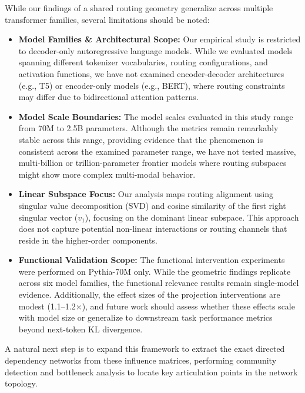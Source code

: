 \documentclass[11pt,a4paper]{article}
\theoremstyle{definition}
\theoremstyle{plain}
\begin{document}
While our findings of a shared routing geometry generalize across multiple transformer families, several limitations should be noted:
\begin{itemize}[leftmargin=*]
    \item \textbf{Model Families \& Architectural Scope:} Our empirical study is restricted to decoder-only autoregressive language models. While we evaluated models spanning different tokenizer vocabularies, routing configurations, and activation functions, we have not examined encoder-decoder architectures (e.g., T5) or encoder-only models (e.g., BERT), where routing constraints may differ due to bidirectional attention patterns.
    \item \textbf{Model Scale Boundaries:} The model scales evaluated in this study range from 70M to 2.5B parameters. Although the metrics remain remarkably stable across this range, providing evidence that the phenomenon is consistent across the examined parameter range, we have not tested massive, multi-billion or trillion-parameter frontier models where routing subspaces might show more complex multi-modal behavior.
    \item \textbf{Linear Subspace Focus:} Our analysis maps routing alignment using singular value decomposition (SVD) and cosine similarity of the first right singular vector ($v_1$), focusing on the dominant linear subspace. This approach does not capture potential non-linear interactions or routing channels that reside in the higher-order components.
    \item \textbf{Functional Validation Scope:} The functional intervention experiments were performed on Pythia-70M only. While the geometric findings replicate across six model families, the functional relevance results remain single-model evidence. Additionally, the effect sizes of the projection interventions are modest (1.1--1.2$\times$), and future work should assess whether these effects scale with model size or generalize to downstream task performance metrics beyond next-token KL divergence.
\end{itemize}

A natural next step is to expand this framework to extract the exact directed dependency networks from these influence matrices, performing community detection and bottleneck analysis to locate key articulation points in the network topology.



\end{document}
